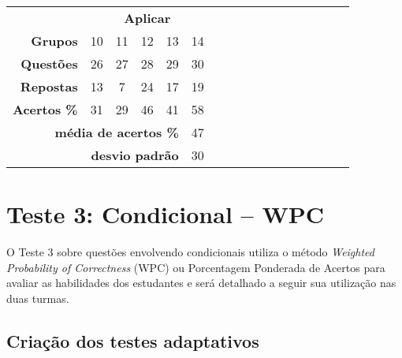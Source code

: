 \begin{table}[htbp]
\begin{tabular}{rccccclllllllllll}
    \multicolumn{1}{|l|}{} & \multicolumn{5}{c|}{\cellcolor{red!25}\textbf{Aplicar}} &  &  &  &  &  &  &  &  &  &  &  \\ \cline{1-6}
    \multicolumn{1}{|r|}{\textbf{Grupos}} & \multicolumn{1}{c|}{10} & \multicolumn{1}{c|}{11} & \multicolumn{1}{c|}{12} & \multicolumn{1}{c|}{13} & \multicolumn{1}{c|}{14} &  &  &  &  &  &  &  &  &  &  &  \\ \cline{1-6}
    \multicolumn{1}{|r|}{\cellcolor[HTML]{D9D9D9}\textbf{Questões}} & \multicolumn{1}{c|}{\cellcolor[HTML]{D9D9D9}26} & \multicolumn{1}{c|}{\cellcolor[HTML]{D9D9D9}27} & \multicolumn{1}{c|}{\cellcolor[HTML]{D9D9D9}28} & \multicolumn{1}{c|}{\cellcolor[HTML]{D9D9D9}29} & \multicolumn{1}{c|}{\cellcolor[HTML]{D9D9D9}30} &  &  &  &  &  &  &  &  &  &  &  \\ 
    \multicolumn{1}{|r|}{\textbf{Repostas}} & \multicolumn{1}{c|}{13} & \multicolumn{1}{c|}{7} & \multicolumn{1}{c|}{24} & \multicolumn{1}{c|}{17} & \multicolumn{1}{c|}{19} &  &  &  &  &  &  &  &  &  &  &  \\ 
    \multicolumn{1}{|r|}{\cellcolor[HTML]{D9D9D9}\textbf{Acertos \%}} & \multicolumn{1}{c|}{\cellcolor[HTML]{D9D9D9}31} & \multicolumn{1}{c|}{\cellcolor[HTML]{D9D9D9}29} & \multicolumn{1}{c|}{\cellcolor[HTML]{D9D9D9}46} & \multicolumn{1}{c|}{\cellcolor[HTML]{D9D9D9}41} & \multicolumn{1}{c|}{\cellcolor[HTML]{D9D9D9}58} &  &  &  &  &  &  &  &  &  &  &  \\ \cline{1-6}
    \multicolumn{5}{r}{\cellcolor[HTML]{F9CB9C}\textbf{média de acertos \%}} & \multicolumn{1}{c}{\cellcolor[HTML]{F9CB9C}47} \\ 
    \multicolumn{5}{r}{\cellcolor[HTML]{F9CB9C}\textbf{desvio padrão}} & \multicolumn{1}{c}{\cellcolor[HTML]{F9CB9C}30} \\ 
    \end{tabular}
    \end{table}


\section{Teste 3: Condicional -- WPC}

O Teste 3 sobre questões envolvendo condicionais utiliza o método \textit{Weighted Probability of Correctness} (WPC) ou Porcentagem Ponderada de Acertos para avaliar as habilidades dos estudantes e será detalhado a seguir sua utilização nas duas turmas.

\subsection{Criação dos testes adaptativos}

